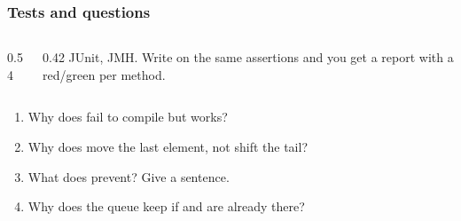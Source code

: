 \documentclass[aspectratio=169,10pt,compress]{beamer}
\begin{document}




\begin{frame}[t,fragile] \frametitle{Tests and questions}
  \begin{columns}[T]
    \begin{column}{0.54\textwidth}
    \end{column}
    \begin{column}{0.42\textwidth}
      \small
       JUnit, JMH. Write  on the same
      assertions and you get a report with a red/green per method.
    \end{column}
  \end{columns}
  \vspace{0.3em}
  \begin{enumerate}\small
    \item Why does  fail to compile but  works?
    \item Why does  move the last element, not shift the tail?
    \item What does  prevent? Give a sentence.
    \item Why does the queue keep  if  and  are already there?
  \end{enumerate}
  \vspace{0.2em}
  \begin{center}
  \end{center}
\end{frame}
\end{document}
